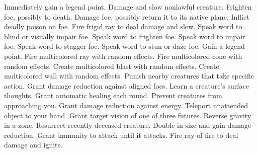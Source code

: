     {Immediately gain a legend point.}
    {Damage and slow nonlawful creature.}
    {Frighten foe, possibly to death.}
    {Damage foe, possibly return it to its native plane.}
    {Inflict deadly poison on foe.}
    {Fire frigid ray to deal damage and slow.}
    {Speak word to blind or visually impair foe.}
    {Speak word to frighten foe.}
    {Speak word to impair foe.}
    {Speak word to stagger foe.}
    {Speak word to stun or daze foe.}
    {Gain a legend point.}
    {Fire multicolored ray with random effects.}
    {Fire multicolored cone with random effects.}
    {Create multicolored blast with random effects.}
    {Create multicolored wall with random effects.}
    {Punish nearby creatures that take specific action.}
    {Grant damage reduction against aligned foes.}
    {Learn a creature's surface thoughts.}
    {Grant automatic healing each round.}
    {Prevent creatures from approaching you.}
    {Grant damage reduction against energy.}
    {Teleport unattended object to your hand.}
    {Grant target vision of one of three futures.}
    {Reverse gravity in a zone.}
    {Resurrect recently deceased creature.}
    {Double in size and gain damage reduction.}
    {Grant immunity to attack until it attacks.}
    {Fire ray of fire to deal damage and ignite.}
